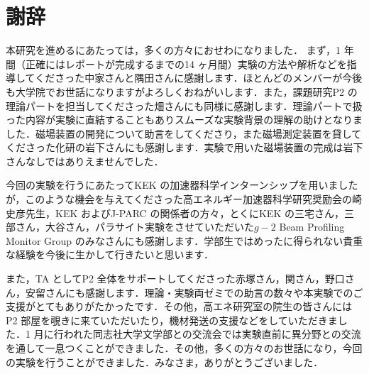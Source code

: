 \section*{謝辞}

本研究を進めるにあたっては，多くの方々におせわになりました．
まず，1 年間（正確にはレポートが完成するまでの14 ヶ月間）実験の方法や解析などを指導してくださった中家さんと隅田さんに感謝します．ほとんどのメンバーが今後も大学院でお世話になりますがよろしくおねがいします．また，課題研究P2 の理論パートを担当してくださった畑さんにも同様に感謝します．理論パートで扱った内容が実験に直結することもありスムーズな実験背景の理解の助けとなりました．磁場装置の開発について助言をしてくださり，また磁場測定装置を貸してくださった化研の岩下さんにも感謝します．実験で用いた磁場装置の完成は岩下さんなしではありえませんでした．

今回の実験を行うにあたってKEK の加速器科学インターンシップを用いましたが，このような機会を与えてくださった高エネルギー加速器科学研究奨励会の崎史彦先生，KEK およびJ-PARC の関係者の方々，とくにKEK の三宅さん，三部さん，大谷さん，パラサイト実験をさせていただいた$g-2$ Beam Profiling Monitor Group のみなさんにも感謝します．学部生ではめったに得られない貴重な経験を今後に生かして行きたいと思います．

また，TA としてP2 全体をサポートしてくださった赤塚さん，関さん，野口さん，安留さんにも感謝します．理論・実験両ゼミでの助言の数々や本実験でのご支援がとてもありがたかったです．その他，高エネ研究室の院生の皆さんにはP2 部屋を覗きに来ていただいたり，機材発送の支援などをしていただきました．1 月に行われた同志社大学文学部との交流会では実験直前に異分野との交流を通して一息つくことができました．その他，多くの方々のお世話になり，今回の実験を行うことができました．みなさま，ありがとうございました．